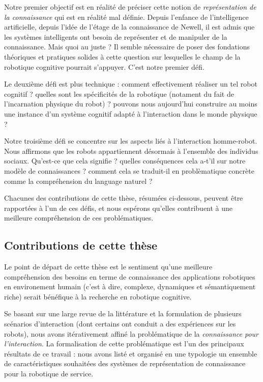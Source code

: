 Notre premier objectif est en réalité de préciser cette notion de
\emph{représentation de la connaissance} qui est en réalité mal définie. Depuis
l'enfance de l'intelligence artificielle, depuis l'idée de \og  l'étage de la
connaissance \fg de Newell, il est admis que les systèmes intelligents ont
besoin de représenter et de manipuler de la connaissance. Mais quoi au juste ?
Il semble nécessaire de poser des fondations théoriques et pratiques solides à
cette question sur lesquelles le champ de la robotique cognitive pourrait
s'appuyer. C'est notre premier défi.

Le deuxième défi est plus technique : comment effectivement réaliser un tel
robot cognitif ? quelles sont les spécificités de la robotique (notament du
fait de l'incarnation physique du robot) ? pouvons nous aujourd'hui construire
au moins une instance d'un système cognitif adapté à l'interaction dans le
monde physique ?

Notre troisième défi se concentre sur les aspects liés à l'interaction
homme-robot. Nous affirmons que les robots appartiennent désormais à l'ensemble
des individus sociaux. Qu'est-ce que cela signifie ? quelles conséquences cela
a-t'il sur notre modèle de connaissances ? comment cela se traduit-il en
problèmatique concrète comme la compréhension du language naturel ?

Chacunes des contributions de cette thèse, résumées ci-dessous, peuvent être
rapportées à l'un de ces défis, et nous espérons qu'elles contribuent à une
meilleure compréhension de ces problématiques.


\subsection{Contributions de cette thèse}
\label{sect|contributions}

Le point de départ de cette thèse est le sentiment qu'une meilleure
compréhension des besoins en terme de connaissance des applications robotiques
en environement humain (c'est à dire, complexe, dynamiques et sémantiquement
riche) serait bénéfique à la recherche en robotique cognitive.

Se basant sur une large revue de la littérature et la formulation de plusieurs
scénarios d'interaction (dont certains ont conduit a des expériences sur les
robots), nous avons itérativement affiné la problématique de la
\emph{connaissance pour l'interaction}. La formalisation de cette problématique
est l'un des principaux résultats de ce travail : nous avons listé et organisé
en une typologie un ensemble de caractéristiques souhaitées des systèmes de
représentation de connaissance pour la robotique de service.

